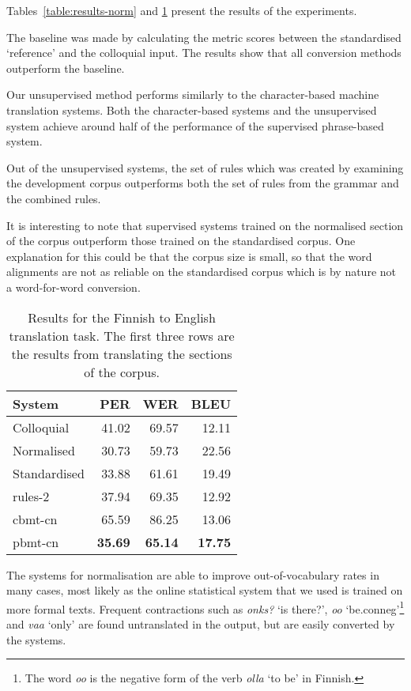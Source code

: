 \documentclass[11pt]{article}
\begin{document}
Tables~\ref{table:results-norm} and \ref{table:results-trad} present the results of the experiments. 

The baseline was made by calculating the metric scores between the standardised `reference' 
and the colloquial input. The results show that all conversion methods outperform the baseline.

Our unsupervised method performs similarly to the character-based machine translation systems. Both 
the character-based systems and the unsupervised system achieve around half of the performance of the 
supervised phrase-based system.

Out of the unsupervised systems, the set of rules which was created by examining the development corpus
outperforms both the set of rules from the grammar and the combined rules.

It is interesting to note that supervised systems trained on the normalised section of the corpus outperform
those trained on the standardised corpus. One explanation for this could be that the corpus size is small, so 
that the word alignments are not as reliable on the standardised corpus which is by nature not a word-for-word 
conversion.

\begin{table}
  \centering
  \begin{tabular}{|l|r|r|r|}
     \hline
    \textbf{System} & \textbf{PER} & \textbf{WER} & \textbf{BLEU} \\
     \hline
     Colloquial &  41.02  &  69.57  & 12.11 \\
     Normalised &  30.73  &  59.73  & 22.56 \\
     Standardised &  33.88  &  61.61  & 19.49 \\
     \hline
     rules-2 &  37.94  &  69.35  & 12.92 \\
     \hline
     {\sc cbmt}-cn &  65.59  &  86.25  & 13.06 \\
     {\sc pbmt}-cn &  \textbf{35.69}  &  \textbf{65.14}  & \textbf{17.75} \\
     \hline
  \end{tabular}
  \caption{Results for the Finnish to English translation task. The first three rows are the results 
    from translating the sections of the corpus.}
  \label{table:results-trad}
\end{table}

The systems for normalisation are able to improve out-of-vocabulary rates in 
many cases, most likely as the online statistical system that we used is trained
on more formal texts. Frequent contractions such as \emph{onks?} `is there?',
\emph{oo} `be.{\sc conneg}'\footnote{The word \emph{oo} is the negative form of the verb \emph{olla} `to be' in Finnish.} and \emph{vaa} `only' are found untranslated in the output, but 
are easily converted by the systems.
\end{document}
